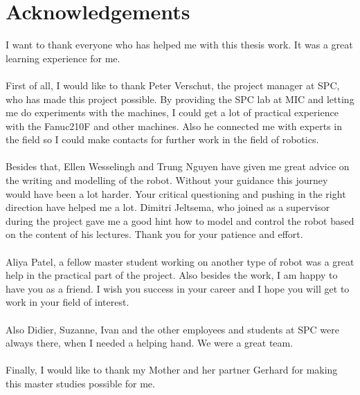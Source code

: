 \chapter*{Acknowledgements}

I want to thank everyone who has helped me with this thesis work. It was a great learning experience for me.\\
\\
First of all, I would like to thank Peter Verschut, the project manager at SPC, who has made this project possible. By providing the SPC lab at MIC and letting me do experiments with the machines, I could get a lot of practical experience with the Fanuc210F and other machines. Also he connected me with experts in the field so I could make contacts for further work in the field of robotics. \\
\\
Besides that, Ellen Wesselingh and Trung Nguyen have given me great advice on the writing and modelling of the robot. Without your guidance this journey would have been a lot harder. Your critical questioning and pushing in the right direction have helped me a lot. Dimitri Jeltsema, who joined as a supervisor during the project gave me a good hint how to model and control the robot based on the content of his lectures. Thank you for your patience and effort. \\
\\
Aliya Patel, a fellow master student working on another type of robot was a great help in the practical part of the project. Also besides the work, I am happy to have you as a friend. I wish you success in your career and I hope you will get to work in your field of interest.\\
\\
Also Didier, Suzanne, Ivan and the other employees and students at SPC were always there, when I needed a helping hand. We were a great team.\\
\\
Finally, I would like to thank my Mother and her partner Gerhard for making this master studies possible for me.
